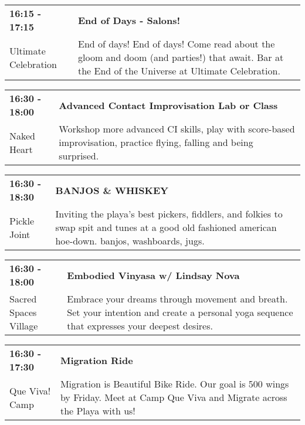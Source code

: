 \begin{tabular}{ p{1in} p{2.2in} }
    \textbf{16:15 - 17:15} & \textbf{End of Days - Salons!} \\
    Ultimate Celebration \newline  & End of days! End of days! Come read about the gloom and doom (and parties!) that await. Bar at the End of the Universe at Ultimate Celebration. \\
    \hline 
\end{tabular}
    
\begin{tabular}{ p{1in} p{2.2in} }
    \textbf{16:30 - 18:00} & \textbf{Advanced Contact Improvisation Lab or Class} \\
    Naked Heart \newline  & Workshop more advanced CI skills, play with score-based improvisation, practice flying, falling and being surprised. \\
    \hline 
\end{tabular}
    
\begin{tabular}{ p{1in} p{2.2in} }
    \textbf{16:30 - 18:30} & \textbf{BANJOS \& WHISKEY} \\
    Pickle Joint \newline  & Inviting the playa's best pickers, fiddlers, and folkies to swap spit and tunes at a good old fashioned american hoe-down. banjos, washboards, jugs. \\
    \hline 
\end{tabular}
    
\begin{tabular}{ p{1in} p{2.2in} }
    \textbf{16:30 - 18:00} & \textbf{Embodied Vinyasa w/ Lindsay Nova} \\
    Sacred Spaces Village \newline  & Embrace your dreams through movement and breath. Set your intention and create a personal yoga sequence that expresses your deepest desires. \\
    \hline 
\end{tabular}
    
\begin{tabular}{ p{1in} p{2.2in} }
    \textbf{16:30 - 17:30} & \textbf{Migration Ride} \\
    Que Viva! Camp \newline  & Migration is Beautiful Bike Ride. Our goal is 500 wings by Friday. Meet at Camp Que Viva and Migrate across the Playa with us! \\
    \hline 
\end{tabular}
    

